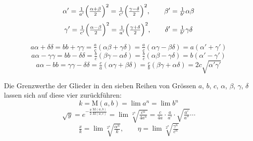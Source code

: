 \documentclass[10pt,a4paper]{article}
\newcommand{\M}{\text{M}}
\begin{document}
\[
\alpha'=\tfrac{1}{a'}\Bigl(\tfrac{\alpha+\beta}{2}\Bigr)^2
       =\tfrac{1}{c'}\Bigl(\tfrac{\gamma-\delta}{2}\Bigr)^2, \qquad
\beta'=\tfrac{1}{b'}\alpha\beta
\]
\[
\gamma'=\tfrac{1}{c'}\Bigl(\tfrac{\alpha-\beta}{2}\Bigr)^2
       =\tfrac{1}{a'}\Bigl(\tfrac{\gamma+\delta}{2}\Bigr)^2, \qquad
\delta'=\tfrac{1}{b'}\gamma\delta
\]

\[
a\alpha+\delta\delta = bb+\gamma\gamma
 = \tfrac{a}{c}(\alpha\beta+\gamma\delta)
 = \tfrac{a}{c}(\alpha\gamma-\beta\delta)
 = a(\alpha'+\gamma')
\]
\[
a\alpha-\gamma\gamma = bb-\delta\delta
 = \tfrac{b}{c}(\beta\gamma-\alpha\delta)
 = \tfrac{b}{c}(\alpha\beta-\gamma\delta)
 = b(\alpha'-\gamma')
\]
\[
a\alpha-bb = \gamma\gamma-\delta\delta
 = \tfrac{c}{a}(\alpha\gamma+\beta\delta)
 = \tfrac{c}{b}(\beta\gamma+\alpha\delta)
 = 2c\sqrt{\alpha'\gamma'}
\]

Die Grenzwerthe der Glieder in den sieben Reihen von Gr\"ossen
$a$, $b$, $c$, $\alpha$, $\beta$, $\gamma$, $\delta$
lassen sich auf diese vier zur\"uckf\"uhren:
\[
k = \M(a,b) = \lim a^n = \lim b^n
\]
\[
\sqrt{y} = e^{-\tfrac{\pi}{2}\tfrac{\M(a,b)}{\M(a,c)}}
        = \lim \sqrt[2^n]{\tfrac{c^n}{4 a^n}}
        = \tfrac{c}{4a}\cdot\tfrac{a}{a'}\cdot\sqrt{\tfrac{a'}{a''}}\cdots
\]
\[
\tfrac{x}{k} = \lim \sqrt[2^n]{\tfrac{\alpha^n}{k}}, \qquad
\eta = \lim \sqrt[2^n]{\tfrac{\gamma^n}{c^n}}
\]
\end{document}
